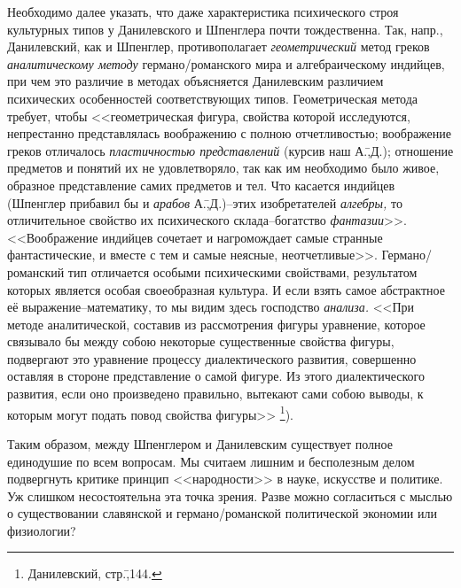 Необходимо далее указать, что даже характеристика психического строя культурных типов у Данилевского и Шпенглера почти тождественна. Так, напр., Данилевский, как и Шпенглер, противополагает \emph{геометрический} метод греков \emph{аналитическому методу} германо\-/романского мира и алгебраическому индийцев, при чем это различие в методах объясняется Данилевским различием психических особенностей соответствующих типов. Геометрическая метода требует, чтобы <<геометрическая фигура, свойства которой исследуются, непрестанно представлялась воображению с полною отчетливостью; воображение греков отличалось \emph{пластичностью представлений} (курсив наш А.\=,Д.); отношение предметов и понятий их не удовлетворяло, так как им необходимо было живое, образное представление самих предметов и тел. Что касается индийцев (Шпенглер прибавил бы и \emph{арабов} А.\=,Д.)\---этих изобретателей \emph{алгебры,} то отличительное свойство их психического склада\---богатство \emph{фантазии}>>. <<Воображение индийцев сочетает и нагромождает самые странные фантастические, и вместе с тем и самые неясные, неотчетливые>>. Германо\-/романский тип отличается особыми психическими свойствами, результатом которых является особая своеобразная культура. И если взять самое абстрактное её выражение\---математику, то мы видим здесь господство \emph{анализа.} <<При методе аналитической, составив из рассмотрения фигуры уравнение, которое связывало бы между собою некоторые существенные свойства фигуры, подвергают это уравнение процессу диалектического развития, совершенно оставляя в стороне представление о самой фигуре. Из этого диалектического развития, если оно произведено правильно, вытекают сами собою выводы, к которым могут подать повод свойства фигуры>> \footnote{Данилевский, стр.\=,144.}).

Таким образом, между Шпенглером и Данилевским существует полное единодушие по всем вопросам. Мы считаем лишним и бесполезным делом подвергнуть критике принцип <<народности>> в науке, искусстве и политике. Уж слишком несостоятельна эта точка зрения. Разве можно согласиться с мыслью о существовании славянской и германо\-/романской политической экономии или физиологии?

